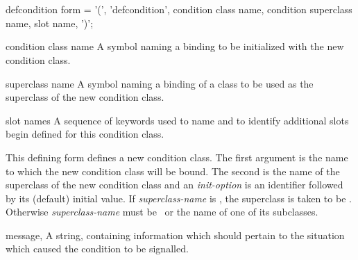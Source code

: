 \begin{optDefinition}
\begin{table}
{    \tts\tts{}\\
    \tts{}\\
    \tts\tts{}\\
    \tts\tts{}\\
    \tts\tts{}\\
    \tts\tts{}\\
    \tts\tts{}\\
}%
\end{table}
\end{optDefinition}
%

\begin{optDefinition}
%
\label{defcondition}
%
\Syntax
\label{defcondition-syntax}
\savesyntax{}\vbox{\syntax
defcondition form
   = '(', 'defcondition',
     condition class name,
     condition superclass name,
     {slot name}, ')';
\endsyntax}
%
\begin{arguments}
    \item[condition class name] A symbol naming a binding to be initialized with
    the new condition class.

    \item[superclass name] A symbol naming a binding of a class to be used as
    the superclass of the new condition class.

    \item[slot names] A sequence of keywords used to name and to
    identify additional slots begin defined for this condition class.
\end{arguments}
%
\remarks%
This defining form defines a new condition class.  The first argument is the
name to which the new condition class will be bound.  The second is the name of
the superclass of the new condition class and an {\em init-option\/} is an
identifier followed by its (default) initial value.  If {\em superclass-name\/}
is \nil, the superclass is taken to be .  Otherwise {\em
    superclass-name\/} must be \ or the name of one of its
subclasses.

\label{\conditionlabel{condition}}
%
\begin{initoptions}
    \item[message, \classref{string}] A string, containing information which
    should pertain to the situation which caused the condition to be signalled.


\end{initoptions}
\end{optDefinition}
